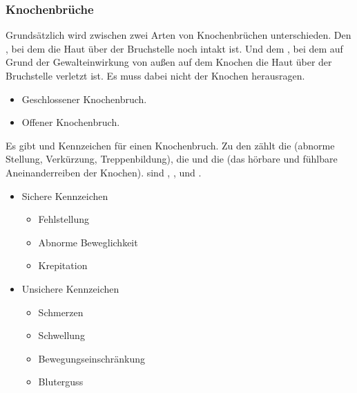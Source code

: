 

\subsubsection{Knochenbrüche}

{
Grundsätzlich wird zwischen zwei Arten von Knochenbrüchen unterschieden. Den
, bei dem die Haut über der Bruchstelle noch
intakt ist. Und dem , bei dem auf Grund der
Gewalteinwirkung von außen auf dem Knochen die Haut über der Bruchstelle verletzt ist. Es muss
dabei nicht der Knochen herausragen.
}{
\begin{itemize}
    \item Geschlossener Knochenbruch.
    \item Offener Knochenbruch.
\end{itemize}
}{}{}{}

{
Es gibt  und  Kennzeichen für einen Knochenbruch. Zu
den  zählt die  (abnorme Stellung,
Verkürzung, Treppenbildung), die  und die
 (das hörbare und fühlbare Aneinanderreiben der Knochen).  sind , ,  und . }{
\begin{itemize}
    \item Sichere Kennzeichen
    \begin{itemize}
        \item Fehlstellung
        \item Abnorme Beweglichkeit
        \item Krepitation
    \end{itemize}
    \item Unsichere Kennzeichen
    \begin{itemize}
        \item Schmerzen
        \item Schwellung
        \item Bewegungseinschränkung
        \item Bluterguss
     \end{itemize}
\end{itemize}
}{}{}{}

